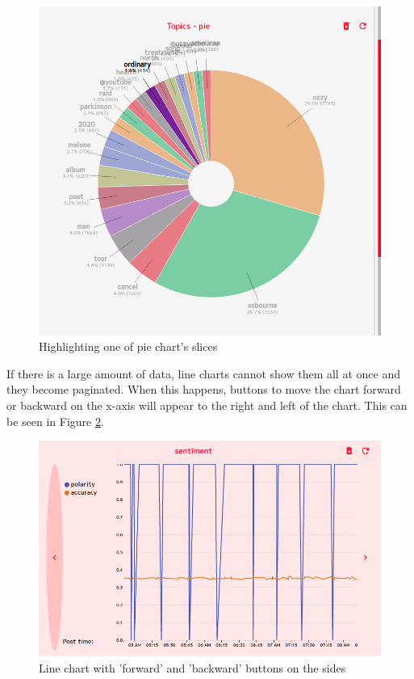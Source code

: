 \documentclass{article}
\begin{document}
\begin{figure}[h]
\includegraphics[width=\textwidth]{images/pie_chart.png}
\centering
\caption{Highlighting one of pie chart's slices}
\label{figure:pie-chart}
\end{figure}

If there is a large amount of data, line charts cannot show them all at once and they become paginated. When this happens, buttons to move the chart forward or backward on the x-axis will appear to the right and left of the chart. This can be seen in Figure \ref{figure:line-chart-pagination}.

\begin{figure}[h]
\includegraphics[width=\textwidth]{images/line_chart.png}
\centering
\caption{Line chart with 'forward' and 'backward' buttons on the sides}
\label{figure:line-chart-pagination}
\end{figure}
\end{document}

